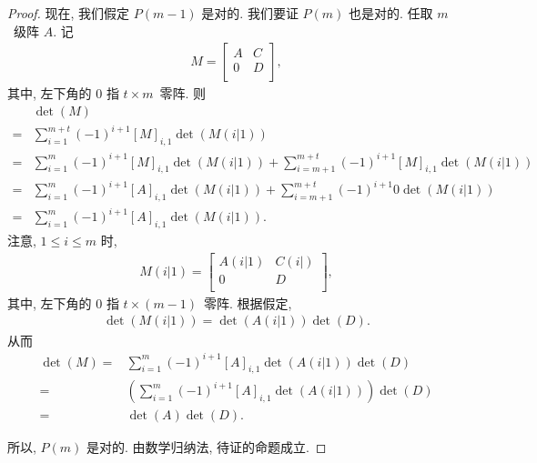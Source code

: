 \documentclass[../libro.tex]{subfiles}
\begin{document}
\begin{proof}
    现在, 我们假定 \(P(m-1)\) 是对的.
    我们要证 \(P(m)\) 也是对的.
    任取 \(m\)~级阵 \(A\).
    记
    \begin{align*}
        M =
        \begin{bmatrix}
            A & C \\
            0 & D \\
        \end{bmatrix},
    \end{align*}
    其中, 左下角的 \(0\) 指 \(t \times m\)~零阵.
    则
    \begin{align*}
        & \det {(M)}
        \\
        = {} & \sum_{i = 1}^{m+t}
        {(-1)^{i+1} [M]_{i,1} \det {(M(i|1))}}
        \\
        = {} & \sum_{i = 1}^{m}
        {(-1)^{i+1} [M]_{i,1} \det {(M(i|1))}}
        + \sum_{i = m+1}^{m+t}
        {(-1)^{i+1} [M]_{i,1} \det {(M(i|1))}}
        \\
        = {} & \sum_{i = 1}^{m}
        {(-1)^{i+1} [A]_{i,1} \det {(M(i|1))}}
        + \sum_{i = m+1}^{m+t}
        {(-1)^{i+1} 0 \det {(M(i|1))}}
        \\
        = {} & \sum_{i = 1}^{m}
        {(-1)^{i+1} [A]_{i,1} \det {(M(i|1))}}.
    \end{align*}
    注意, \(1 \leq i \leq m\) 时,
    \begin{align*}
        M(i|1) =
        \begin{bmatrix}
            A(i|1) & C(i|) \\
            0      & D     \\
        \end{bmatrix},
    \end{align*}
    其中, 左下角的 \(0\) 指 \(t \times (m-1)\)~零阵.
    根据假定,
    \begin{align*}
        \det {(M(i|1))} = \det {(A(i|1))} \det {(D)}.
    \end{align*}
    从而
    \begin{align*}
        \det {(M)}
        = {} & \sum_{i = 1}^{m}
        {(-1)^{i+1} [A]_{i,1} \det {(A(i|1))} \det {(D)}}
        \\
        = {} & \left(\sum_{i = 1}^{m}
        {(-1)^{i+1} [A]_{i,1} \det {(A(i|1))}}\right)
        \det {(D)}
        \\
        = {} & \det {(A)} \det {(D)}.
    \end{align*}

    所以, \(P(m)\) 是对的.
    由数学归纳法, 待证的命题成立.
\end{proof}
\end{document}
